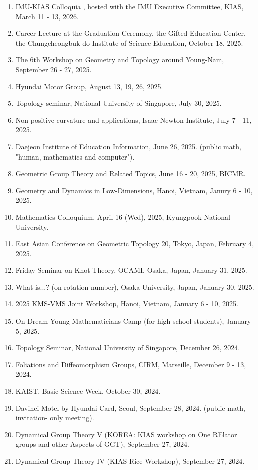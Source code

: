 \documentclass[11pt,a4paper]{article}
\begin{document}
\begin{enumerate}[leftmargin=1.5em, label=\arabic*.]
\item IMU-KIAS Colloquia , hosted with the IMU Executive Committee, KIAS, March 11 - 13, 2026.
\item Career Lecture at the Graduation Ceremony, the Gifted Education Center, the Chungcheongbuk-do Institute of Science Education, October 18, 2025.
\item The 6th Workshop on Geometry and Topology around Young-Nam, September 26 - 27, 2025.
\item Hyundai Motor Group, August 13, 19, 26, 2025.
\item Topology seminar, National University of Singapore, July 30, 2025.
\item Non-positive curvature and applications, Isaac Newton Institute, July 7 - 11, 2025.
\item Daejeon Institute of Education Information, June 26, 2025. (public math, "human, mathematics and computer").
\item Geometric Group Theory and Related Topics, June 16 - 20, 2025, BICMR.
\item Geometry and Dynamics in Low-Dimensions, Hanoi, Vietnam, Janury 6 - 10, 2025.
\item Mathematics Colloquium, April 16 (Wed), 2025, Kyungpook National University.
\item East Asian Conference on Geometric Topology 20, Tokyo, Japan, February 4, 2025.
\item Friday Seminar on Knot Theory, OCAMI, Osaka, Japan, January 31, 2025.
\item What is...? (on rotation number), Osaka University, Japan, January 30, 2025.
\item 2025 KMS-VMS Joint Workshop, Hanoi, Vietnam, January 6 - 10, 2025.
\item On Dream Young Mathematicians Camp (for high school students), January 5, 2025.
\item Topology Seminar, National University of Singapore, December 26, 2024.
\item Foliations and Diffeomorphism Groups, CIRM, Marseille, December 9 - 13, 2024.
\item KAIST, Basic Science Week, October 30, 2024.
\item Davinci Motel by Hyundai Card, Seoul, September 28, 2024. (public math, invitation- only meeting).
\item Dynamical Group Theory V (KOREA: KIAS workshop on One RElator groups and other Aspects of GGT), September 27, 2024.
\item Dynamical Group Theory IV (KIAS-Rice Workshop), September 27, 2024.

\end{enumerate}
\end{document}
